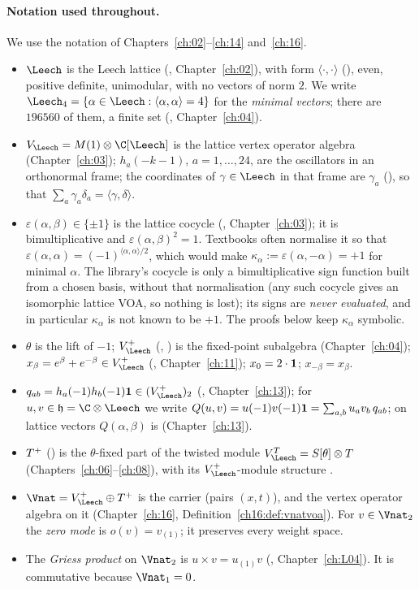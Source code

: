\paragraph{Notation used throughout.}  We use the notation of Chapters~\ref{ch:02}--\ref{ch:14} and~\ref{ch:16}.
\begin{itemize}
\item $\Leech$ is the Leech lattice (, Chapter~\ref{ch:02}), with form $\langle\cdot,\cdot\rangle$
  (), even, positive definite, unimodular, with no vectors of norm $2$.  We write
  $\chtwentyLf=\{\alpha\in\Leech:\langle\alpha,\alpha\rangle=4\}$ for the \emph{minimal vectors}; there are $196560$
  of them, a finite set (, Chapter~\ref{ch:04}).
\item $V_\Leech=M(1)\otimes\C[\Leech]$ is the lattice vertex operator algebra (Chapter~\ref{ch:03}); $h_a(-k-1)$,
  $a=1,\dots,24$, are the oscillators in an orthonormal frame; the coordinates of $\gamma\in\Leech$ in that frame are
  $\gamma_a$ (), so that $\sum_a\gamma_a\delta_a=\langle\gamma,\delta\rangle$.
\item $\varepsilon(\alpha,\beta)\in\{\pm1\}$ is the lattice cocycle (,
  Chapter~\ref{ch:03}); it is bimultiplicative and $\varepsilon(\alpha,\beta)^2=1$.  Textbooks often normalise it
  so that $\varepsilon(\alpha,\alpha)=(-1)^{\langle\alpha,\alpha\rangle/2}$, which would make $\kappa_\alpha:=\varepsilon(\alpha,-\alpha)=+1$ for
  minimal $\alpha$.  The library's cocycle is only a bimultiplicative sign function built from a chosen basis, without that
  normalisation (any such cocycle gives an isomorphic lattice VOA, so nothing is lost); its signs are \emph{never evaluated},
  and in particular $\kappa_\alpha$ is not known to be $+1$.  The proofs below keep $\kappa_\alpha$ symbolic.
\item $\theta$ is the lift of $-1$; $\chtwentyVL$ (, ) is the fixed-point
  subalgebra (Chapter~\ref{ch:04}); $x_\beta=e^\beta+e^{-\beta}\in\chtwentyVL$ (,
  Chapter~\ref{ch:11}); $x_0=2\cdot\mathbf 1$; $x_{-\beta}=x_\beta$.
\item $q_{ab}=h_a(-1)h_b(-1)\chtwentyvac\in(\chtwentyVL)_2$ (, Chapter~\ref{ch:13}); for
  $u,v\in\mathfrak h=\C\otimes\Leech$ we write $Q(u,v)=u(-1)v(-1)\mathbf 1=\sum_{a,b}u_av_b\,q_{ab}$; on lattice
  vectors $Q(\alpha,\beta)$ is  (Chapter~\ref{ch:13}).
\item $T^{+}$ () is the $\theta$-fixed part of the twisted module $V_\Leech^T=S[\theta]\otimes T$
  (Chapters~\ref{ch:06}--\ref{ch:08}), with its $\chtwentyVL$-module structure .
\item $\Vnat=\chtwentyVL\oplus\chtwentyTp$ is the carrier  (pairs $(x,t)$), and  the
  vertex operator algebra on it (Chapter~\ref{ch:16}, Definition~\ref{ch16:def:vnatvoa}).  For $v\in\Vnat_2$ the
  \emph{zero mode} is $o(v)=v_{(1)}$; it preserves every weight space.
\item The \emph{Griess product} on $\Vnat_2$ is $u\times v=u_{(1)}v$ (, Chapter~\ref{ch:L04}).  It is
  commutative because $\Vnat_1=0$.
\end{itemize}
